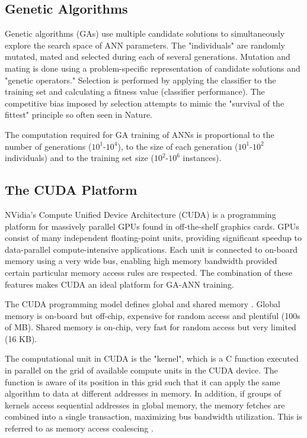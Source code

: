 \documentclass[11pt]{article}       %
\begin{document}
\subsection{Genetic Algorithms} \label{ga}
Genetic algorithms (GAs) use multiple candidate solutions to simultaneously explore the search space of ANN parameters. The "individuals" are randomly mutated, mated and selected during each of several generations. Mutation and mating is done using a problem-specific representation of candidate solutions and "genetic operators." Selection is performed by applying the classifier to the training set and calculating a fitness value (classifier performance). The competitive bias imposed by selection attempts to mimic the "survival of the fittest" principle so often seen in Nature.

The computation required for GA training of ANNs is proportional to the number of generations ($10^1$-$10^4$), to the size of each generation ($10^1$-$10^2$ individuals) and to the training set size ($10^2$-$10^6$ instances).

\subsection{The CUDA Platform} \label{cuda}
NVidia's Compute Unified Device Architecture (CUDA) is a programming platform for massively parallel GPUs found in off-the-shelf graphics cards. GPUs consist of many independent floating-point units, providing significant speedup to data-parallel compute-intensive applications. Each unit is connected to on-board memory using a very wide bus, enabling high memory bandwidth provided certain particular memory access rules are respected. The combination of these features makes CUDA an ideal platform for GA-ANN training.

The CUDA programming model defines global and shared memory \cite[\S3.2]{CudaProgGuide3.0}. Global memory is on-board but off-chip, expensive for random access and plentiful (100s of MB). Shared memory is on-chip, very fast for random access but very limited (16 KB).

The computational unit in CUDA is the "kernel", which is a C function executed in parallel on the grid of available compute units in the CUDA device. The function is aware of its position in this grid such that it can apply the same algorithm to data at different addresses in memory. In addition, if groups of kernels access sequential addresses in global memory, the memory fetches are combined into a single transaction, maximizing bus bandwidth utilization. This is referred to as memory access coalescing \cite[\S5.3.2.1]{CudaProgGuide3.0}.
\end{document}
